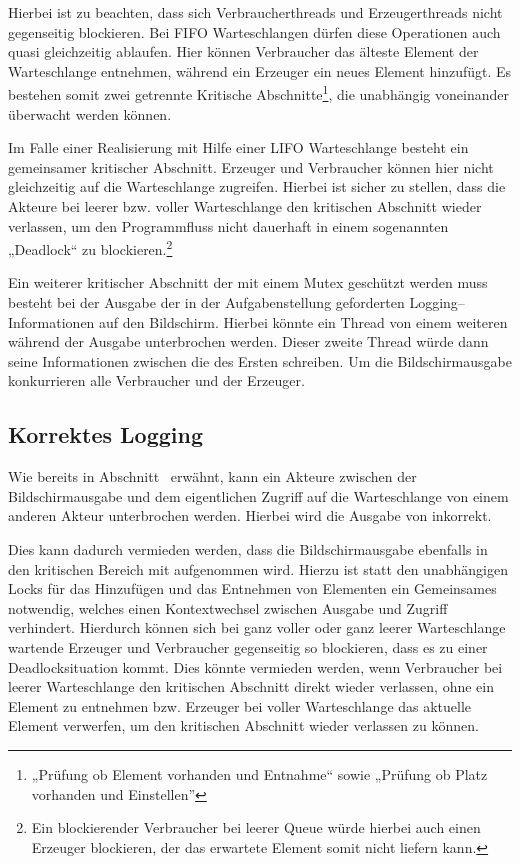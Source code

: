 Hierbei ist zu beachten, dass sich Verbraucherthreads und Erzeugerthreads nicht gegenseitig blockieren. Bei \ac{FIFO} Warteschlangen dürfen diese Operationen auch quasi gleichzeitig ablaufen. Hier können Verbraucher das älteste Element der Warteschlange entnehmen, während ein Erzeuger ein neues Element hinzufügt. Es bestehen somit zwei getrennte Kritische Abschnitte\footnote{„Prüfung ob Element vorhanden und Entnahme“ sowie „Prüfung ob Platz vorhanden und Einstellen”}, die unabhängig voneinander überwacht werden können.

Im Falle einer Realisierung mit Hilfe einer \ac{LIFO} Warteschlange besteht ein gemeinsamer kritischer Abschnitt. Erzeuger und Verbraucher können hier nicht gleichzeitig auf die Warteschlange zugreifen. Hierbei ist sicher zu stellen, dass die Akteure bei leerer bzw. voller Warteschlange den kritischen Abschnitt wieder verlassen, um den Programmfluss nicht dauerhaft in einem sogenannten „Deadlock“ zu blockieren.\footnote{Ein blockierender Verbraucher bei leerer Queue würde hierbei auch einen Erzeuger blockieren, der das erwartete Element somit nicht liefern kann.}

Ein weiterer kritischer Abschnitt der mit einem Mutex geschützt werden muss besteht bei der Ausgabe der in der Aufgabenstellung geforderten Logging–Informationen auf den Bildschirm. Hierbei könnte ein Thread von einem weiteren während der Ausgabe unterbrochen werden. Dieser zweite Thread würde dann seine Informationen zwischen die des Ersten schreiben. Um die Bildschirmausgabe konkurrieren alle Verbraucher und der Erzeuger.

\subsection{Korrektes Logging} %
\label{sub:korrektes_logging}
Wie bereits in Abschnitt~ erwähnt, kann ein Akteure  zwischen der Bildschirmausgabe und dem eigentlichen Zugriff auf die Warteschlange von einem anderen Akteur  unterbrochen werden. Hierbei wird die Ausgabe von  inkorrekt.

Dies kann dadurch vermieden werden, dass die Bildschirmausgabe ebenfalls in den kritischen Bereich mit aufgenommen wird. Hierzu ist statt den unabhängigen Locks für das Hinzufügen und das Entnehmen von Elementen ein Gemeinsames notwendig, welches einen Kontextwechsel zwischen Ausgabe und Zugriff verhindert. Hierdurch können sich bei ganz voller oder ganz leerer Warteschlange wartende Erzeuger und Verbraucher gegenseitig so blockieren, dass es zu einer Deadlocksituation kommt. Dies könnte vermieden werden, wenn Verbraucher bei leerer Warteschlange den kritischen Abschnitt direkt wieder verlassen, ohne ein Element zu entnehmen bzw. Erzeuger bei voller Warteschlange das aktuelle Element verwerfen, um den kritischen Abschnitt wieder verlassen zu können.

